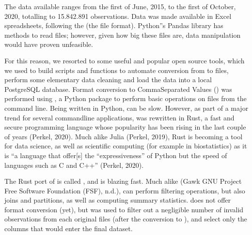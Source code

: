 \documentclass[letterpaper,10pt,english]{jupyterBook}
\begin{document}
\sphinxAtStartPar
The data available ranges from the first of June, 2015, to the first of October, 2020, totalling to 15.842.891 observations. Data was made available in Excel spreadsheets, following the  (the  file format). Python”s Pandas library has methods to read  files; however, given how big these files are, data manipulation would have proven unfeasible.

\sphinxAtStartPar
For this reason, we resorted to some useful and popular open source tools, which we used to build  scripts and functions to automate conversion from  to  files, perform some elementary data cleaning and load the data into a local PostgreSQL database. Format conversion to Comma\sphinxhyphen{}Separated Values () was performed using , a Python package to perform basic operations on  files from the command line. Being written in Python,  can be slow. However, as part of a major trend for several command\sphinxhyphen{}line applications,  was rewritten in Rust, a fast and secure programming language whose popularity has been rising in the last couple of years (Perkel, 2020). Much alike Julia (Perkel, 2019), Rust is becoming a tool for data science, as well as scientific computing (for example in bio\sphinxhyphen{}statistics) as it is “a language that offer{[}s{]} the “expressiveness” of Python but the speed of languages such as C and C++” (Perkel, 2020).

\sphinxAtStartPar
The Rust port of  is called , and is blazing fast. Much alike  (Gawk \sphinxhyphen{} GNU Project \sphinxhyphen{} Free Software Foundation (FSF), n.d.),  can perform filtering operations, but also joins and partitions, as well as computing summary statistics.  does not offer format conversion (yet), but was used to filter out a negligible number of invalid observations from each original  files (after the conversion to ), and select only the columns that would enter the final dataset.
\end{document}
